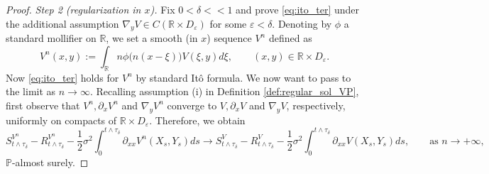 \documentclass[10pt]{article}
\numberwithin{equation}{section}
\theoremstyle{plain}
\numberwithin{theorem}{section}
\theoremstyle{definition}
\def \R {\mathbb{R}}
\newcommand{\<}{\langle}
\renewcommand{\>}{\rangle}
\renewcommand{\(}{\left(}
\renewcommand{\)}{\right)}
\newcommand\Pb{\mathbb{P}}
\newcommand\eps{\varepsilon}
\def \R  {{\mathbb {R}}}
\def \eps {{\varepsilon}}
\def \R {{\mathbb {R}}}
\def \eps {{\varepsilon}}
\begin{document}
{{{\begin{proof}
\emph{Step 2 (regularization in $x$).} Fix $0<\delta<<1$ and prove \eqref{eq:ito_ter} under the additional assumption $\nabla_y V \in C (\R\times D_{\eps})$ for some $\eps<\delta$. Denoting by $\phi$ a standard mollifier on $\R$, we set a smooth (in $x$) sequence $V^n$ defined as
\begin{equation}\label{E1}
{{V}^n(x,y):=\int_{\R} n\phi\big(n(x-\xi)\big) V(\xi,y) d\xi
, \qquad (x,y)\in \R\times D_{\eps}.} 
\end{equation}
Now \eqref{eq:ito_ter} holds for $V^n$ by standard It\^o formula. We now want to pass to the limit as $n\to \infty$. Recalling assumption (i) in Definition \ref{def:regular_sol_VP}, first observe that $V^n, \partial_x V^n$ and $\nabla_y V^n$ converge to $V, \partial_x V$ and $\nabla_y V$, respectively, uniformly on compacts of $ \R\times {D_{\eps}}$. %
Therefore, we obtain %
\begin{equation}%
S^{V^n}_{t\wedge \tau_{\delta}} - R^{V^n}_{t\wedge \tau_{\delta}} - \frac12 \sigma^2 \int_{0}^{t\wedge \tau_{\delta}} \partial_{xx} V^n (X_s , Y_s ) ds \longrightarrow S^{V}_{t\wedge \tau_{\delta}} - R^{V}_{t\wedge \tau_{\delta}} -  \frac12 \sigma^2  \int_{0}^{t\wedge \tau_{\delta}} \partial_{xx} V (X_s , Y_s ) ds, \qquad \text{as } n\to+\infty,
\end{equation}
$\Pb$-almost surely.


\end{proof}}}}
\end{document}
